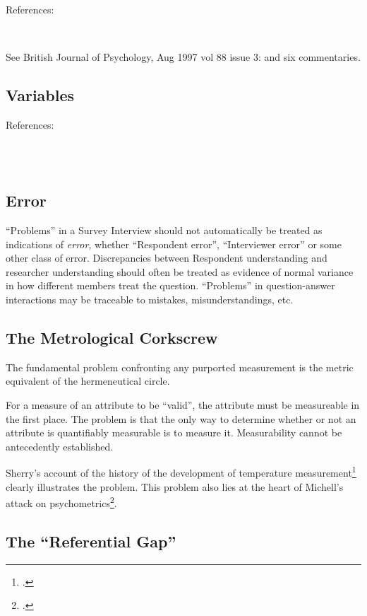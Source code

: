\documentclass[11pt,twoside]{article}
\newcommand{\SRIV}{Survey Interview}
\newcommand{\Iver}{Interviewer}
\newcommand{\R}{Respondent}
\begin{document}
\noindent References:

\noindent
\cite{michell_normal_2000}\\
\cite{sherry_thermoscopes_2011}

See British Journal of Psychology, Aug 1997 vol 88 issue 3:
\cite{michell_quantitative_1997} and six commentaries.

\subsection{Variables}

References:

\noindent
\cite{toomela_variables_2008}\\
\cite{schwarz_is_2009}\\
\cite{stam_fault_2010}

\subsection{Error}
\enquote{Problems} in a \SRIV{} should not automatically be treated as
indications of \textit{error}, whether \enquote{\R{} error},
\enquote{\Iver{} error} or some other class of error.  Discrepancies
between \R{} understanding and researcher understanding should often
be treated as evidence of normal variance in how different members
treat the question.  \enquote{Problems} in question-answer
interactions may be traceable to mistakes, misunderstandings, etc.

\subsection{The Metrological Corkscrew}

The fundamental problem confronting any purported measurement is the
metric equivalent of the hermeneutical circle.

For a measure of an attribute to be \enquote{valid}, the attribute
must be measureable in the first place.  The problem is that the only
way to determine whether or not an attribute is quantifiably
measurable is to measure it.  Measurability cannot be antecedently
established.

Sherry's account of the history of the development of temperature
measurement\footcite{sherry_thermoscopes_2011} clearly illustrates the
problem.  This problem also lies at the heart of Michell's attack on
psychometrics\footcite{michell_normal_2000}.


\subsection{The \enquote{Referential Gap}}
\end{document}
